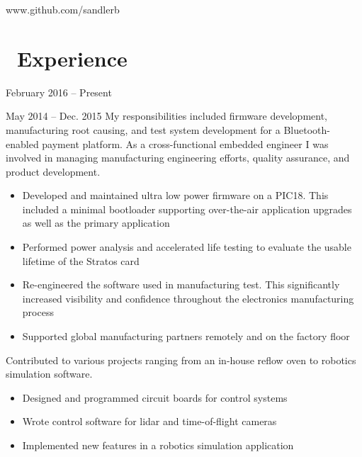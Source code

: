 \documentclass{resume}
\begin{document}


            {www.github.com/sandlerb}
 
\section{\faWrench\ Experience}
          {February 2016 -- Present}
\vspace{3mm}

          {May 2014 -- Dec. 2015}
My responsibilities included firmware development, manufacturing
root causing, and test system development for a Bluetooth-enabled payment
platform.  As a cross-functional embedded engineer I was involved in managing
manufacturing engineering efforts, quality assurance, and product development.
\begin{itemize}
  \item Developed and maintained ultra low power firmware on a PIC18. This
      included a minimal bootloader supporting over-the-air application
      upgrades as well as the primary application
  \item Performed power analysis and accelerated life testing to evaluate the
      usable lifetime of the Stratos card
  \item Re-engineered the software used in manufacturing test. This 
      significantly increased visibility and confidence throughout the 
      electronics manufacturing process
  \item Supported global manufacturing partners remotely and on the factory floor
\end{itemize}
\vspace{3mm}

Contributed to various projects ranging from an in-house reflow oven to robotics
simulation software.
\begin{itemize}
  \item Designed and programmed circuit boards for control systems
  \item Wrote control software for lidar and time-of-flight cameras
  \item Implemented new features in a robotics simulation application
\end{itemize}
\vspace{3mm}
\end{document}
